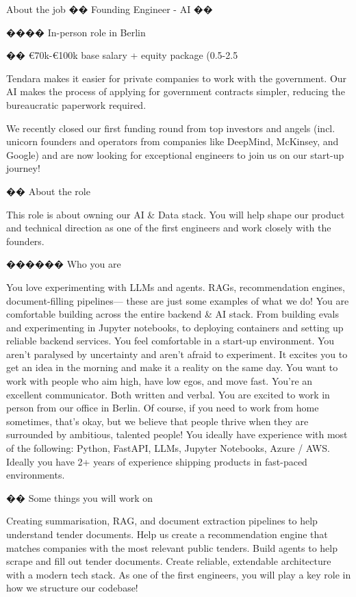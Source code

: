 About the job
�� Founding Engineer - AI ��

���� In-person role in Berlin

�� €70k-€100k base salary + equity package (0.5-2.5%



Tendara makes it easier for private companies to work with the government. Our AI makes the process of applying for government contracts simpler, reducing the bureaucratic paperwork required.



We recently closed our first funding round from top investors and angels (incl. unicorn founders and operators from companies like DeepMind, McKinsey, and Google) and are now looking for exceptional engineers to join us on our start-up journey!



�� About the role

This role is about owning our AI & Data stack. You will help shape our product and technical direction as one of the first engineers and work closely with the founders.



����‍�� Who you are

You love experimenting with LLMs and agents. RAGs, recommendation engines, document-filling pipelines— these are just some examples of what we do!
You are comfortable building across the entire backend & AI stack. From building evals and experimenting in Jupyter notebooks, to deploying containers and setting up reliable backend services.
You feel comfortable in a start-up environment. You aren’t paralysed by uncertainty and aren’t afraid to experiment. It excites you to get an idea in the morning and make it a reality on the same day.
You want to work with people who aim high, have low egos, and move fast.
You’re an excellent communicator. Both written and verbal.
You are excited to work in person from our office in Berlin. Of course, if you need to work from home sometimes, that’s okay, but we believe that people thrive when they are surrounded by ambitious, talented people!
You ideally have experience with most of the following: Python, FastAPI, LLMs, Jupyter Notebooks, Azure / AWS.
Ideally you have 2+ years of experience shipping products in fast-paced environments.


��️ Some things you will work on

Creating summarisation, RAG, and document extraction pipelines to help understand tender documents.
Help us create a recommendation engine that matches companies with the most relevant public tenders.
Build agents to help scrape and fill out tender documents.
Create reliable, extendable architecture with a modern tech stack. As one of the first engineers, you will play a key role in how we structure our codebase!


